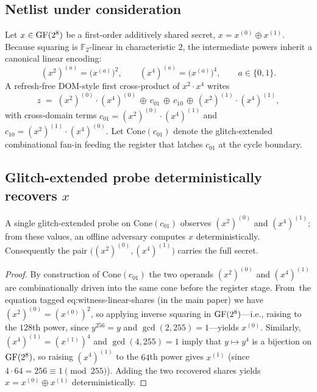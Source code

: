 \documentclass[journal,onecolumn]{IEEEtran}
\begin{document}
\subsection{Netlist under consideration}

Let $x\in\mathrm{GF}(2^{8})$ be a first-order additively shared secret,
$x = x^{(0)}\oplus x^{(1)}$. Because squaring is $\mathbb{F}_{2}$-linear
in characteristic $2$, the intermediate powers inherit a
canonical linear encoding:
\begin{equation}
(x^{2})^{(a)} = \bigl(x^{(a)}\bigr)^{2},
\qquad
(x^{4})^{(a)} = \bigl(x^{(a)}\bigr)^{4},
\qquad a\in\{0,1\}.
\label{eq:witness-linear-shares}
\end{equation}
A refresh-free DOM-style first cross-product of
$x^{2}\!\cdot\!x^{4}$ writes
\begin{equation}
z \;=\; (x^{2})^{(0)}\!\cdot\!(x^{4})^{(0)} \,\oplus\, c_{01} \,\oplus\, c_{10} \,\oplus\, (x^{2})^{(1)}\!\cdot\!(x^{4})^{(1)},
\label{eq:witness-z}
\end{equation}
with cross-domain terms
$c_{01} = (x^{2})^{(0)}\!\cdot\!(x^{4})^{(1)}$ and
$c_{10} = (x^{2})^{(1)}\!\cdot\!(x^{4})^{(0)}$. Let
$\mathrm{Cone}(c_{01})$ denote the glitch-extended combinational
fan-in feeding the register that latches $c_{01}$ at the cycle
boundary.

\subsection{Glitch-extended probe deterministically recovers $x$}

\begin{lemma}
\label{lem:witness-recover}
A single glitch-extended probe on $\mathrm{Cone}(c_{01})$ observes
$(x^{2})^{(0)}$ and $(x^{4})^{(1)}$; from these values, an offline
adversary computes $x$ deterministically. Consequently the pair
$\bigl((x^{2})^{(0)},(x^{4})^{(1)}\bigr)$ carries the full secret.
\end{lemma}

\begin{proof}
By construction of
$\mathrm{Cone}(c_{01})$ the two operands $(x^{2})^{(0)}$ and
$(x^{4})^{(1)}$ are combinationally driven into the same cone before
the register stage. From~the equation tagged eq:witness-linear-shares (in the main paper) we have
$(x^{2})^{(0)} = (x^{(0)})^{2}$, so applying inverse squaring in
$\mathrm{GF}(2^{8})$---i.e., raising to the $128$th power, since
$y^{256}=y$ and $\gcd(2,255)=1$---yields $x^{(0)}$. Similarly,
$(x^{4})^{(1)} = (x^{(1)})^{4}$ and $\gcd(4,255)=1$ imply that
$y\mapsto y^{4}$ is a bijection on $\mathrm{GF}(2^{8})$, so raising
$(x^{4})^{(1)}$ to the $64$th power gives $x^{(1)}$ (since
$4\cdot 64 = 256 \equiv 1 \pmod{255}$). Adding the two recovered
shares yields $x = x^{(0)}\oplus x^{(1)}$ deterministically.
\end{proof}
\end{document}
